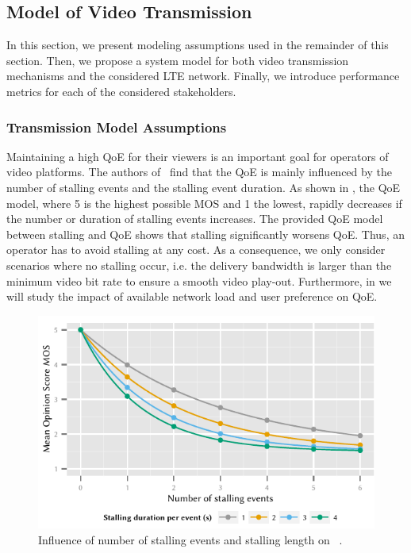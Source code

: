 \subsection{Model of  Video Transmission}\label{sec:application:lte_video:system_model}
In this section, we present modeling assumptions used in the remainder of this section.
Then, we propose a system model for both video transmission mechanisms and the considered \gls{LTE} network.
Finally, we introduce performance metrics for each of the considered stakeholders.

\subsubsection*{Transmission Model Assumptions}\label{sec:application:lte_video:system_model:model_assumptions}
Maintaining a high \gls{QoE} for their viewers is an important goal for operators of video platforms.
The authors of~\cite{Hossfeld2012a} find that the \gls{QoE} is mainly influenced by the number of stalling events and the stalling event duration.
As shown in , the \gls{QoE} model, where 5 is the highest possible \gls{MOS} and 1 the lowest, rapidly decreases if the number or duration of stalling events increases.
The provided \gls{QoE} model between stalling and \gls{QoE} shows that stalling significantly worsens \gls{QoE}.
Thus, an operator has to avoid stalling at any cost.
As a consequence, we only consider scenarios where no stalling occur, i.e. the delivery bandwidth is larger than the minimum video bit rate to ensure a smooth video play-out.
Furthermore, in  we will study the impact of available network load and user preference on \gls{QoE}.

\begin{figure}
  \includegraphics{application/lte_video/system_model/figures/stalling2qoe}
  \caption{Influence of number of stalling events and stalling length on ~\cite{Hossfeld2012a}.}
  \label{fig:application:lte_video:system_model:stalling2qoe}
\end{figure}


